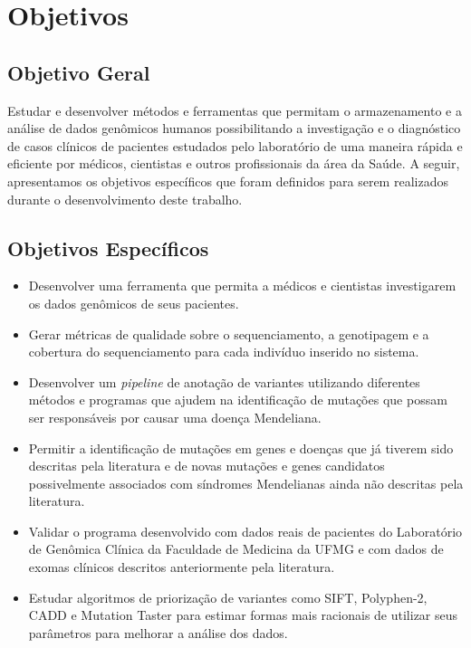 \chapter[Objetivos]{Objetivos}

\section{Objetivo Geral}

Estudar e desenvolver métodos e ferramentas que permitam o armazenamento e a análise de dados genômicos humanos possibilitando a investigação e o diagnóstico de casos clínicos de pacientes estudados pelo laboratório de uma maneira rápida e eficiente por médicos, cientistas e outros profissionais da área da Saúde. A seguir, apresentamos os objetivos específicos que foram definidos para serem realizados durante o desenvolvimento deste trabalho.

\section{Objetivos Específicos}

\begin{itemize}
  \item Desenvolver uma ferramenta que permita a médicos e cientistas investigarem os dados genômicos de seus pacientes.
  \item Gerar métricas de qualidade sobre o sequenciamento, a genotipagem e a cobertura do sequenciamento para cada indivíduo inserido no sistema.
  \item Desenvolver um \textit{pipeline} de anotação de variantes utilizando diferentes métodos e programas que ajudem na identificação de mutações que possam ser responsáveis por causar uma doença Mendeliana.
  \item Permitir a identificação de mutações em genes e doenças que já tiverem sido descritas pela literatura e de novas mutações e genes candidatos possivelmente associados com síndromes Mendelianas ainda não descritas pela literatura.
  \item Validar o programa desenvolvido com dados reais de pacientes do Laboratório de Genômica Clínica da Faculdade de Medicina da UFMG e com dados de exomas clínicos descritos anteriormente pela literatura.
  \item Estudar algoritmos de priorização de variantes como SIFT, Polyphen-2, CADD e Mutation Taster para estimar formas mais racionais de utilizar seus parâmetros para melhorar a análise dos dados.
\end{itemize}
